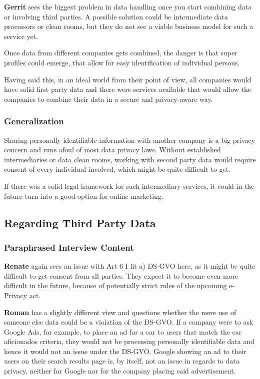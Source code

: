 \textbf{Gerrit} sees the biggest problem in data handling once you start combining data or involving third parties. A possible solution could be intermediate data processors or clean rooms, but they do not see a viable business model for such a service yet.

Once data from different companies gets combined, the danger is that super profiles could emerge, that allow for easy identification of individual persons.

Having said this, in an ideal world from their point of view, all companies would have solid first party data and there were services available that would allow the companies to combine their data in a secure and privacy-aware way. 

\subsubsection{Generalization}

Sharing personally identifiable information with another company is a big privacy concern and runs afoul of most data privacy laws. Without established intermediaries or data clean rooms, working with second party data would require consent of every individual involved, which might be quite difficult to get.

If there was a solid legal framework for such intermediary services, it could in the future turn into a good option for online marketing.

\subsection{Regarding Third Party Data}

\subsubsection{Paraphrased Interview Content}

\textbf{Renate} again sees an issue with Art 6 I lit a) DS-GVO here, as it might be quite difficult to get consent from all parties. They expect it to become even more difficult in the future, because of potentially strict rules of the upcoming e-Privacy act.

\textbf{Roman} has a slightly different view and questions whether the mere use of someone else data could be a violation of the DS-GVO. If a company were to ask Google Ads, for example, to place an ad for a car to users that match the car aficionados criteria, they would not be processing personally identifiable data and hence it would not an issue under the DS-GVO. Google showing an ad to their users on their search results page is, by itself, not an issue in regards to data privacy, neither for Google nor for the company placing said advertisement.


